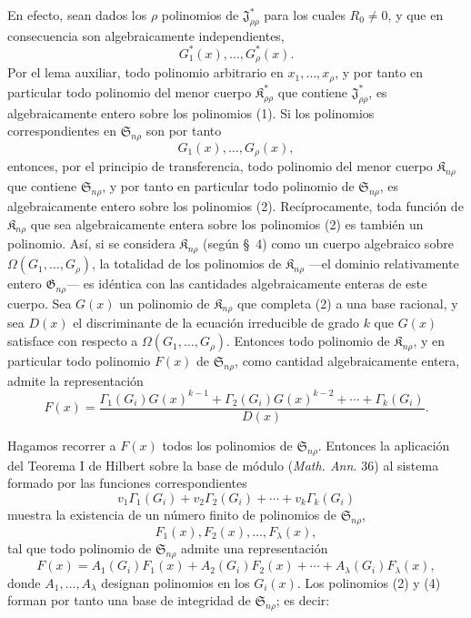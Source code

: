 \documentclass[11pt]{article}
\providecommand{\Kfield}{\mathfrak{K}}
\providecommand{\Ssys}{\mathfrak{S}}
\providecommand{\Jdom}{\mathfrak{J}}
\providecommand{\Gdom}{\mathfrak{G}}
\begin{document}
En efecto, sean dados los $\rho$ polinomios de $\Jdom^*_{\rho\rho}$ para los cuales $R_0\ne0$, y que en consecuencia son algebraicamente independientes,
\begin{equation}
  G_1^*(x),\ldots,G_\rho^*(x).
\tag{1}
\end{equation}
Por el lema auxiliar, todo polinomio arbitrario en $x_1,\ldots,x_\rho$, y por tanto en particular todo polinomio del menor cuerpo $\Kfield^*_{\rho\rho}$ que contiene $\Jdom^*_{\rho\rho}$, es algebraicamente entero sobre los polinomios (1). Si los polinomios correspondientes en $\Ssys_{n\rho}$ son por tanto
\begin{equation}
  G_1(x),\ldots,G_\rho(x),
\tag{2}
\end{equation}
entonces, por el principio de transferencia, todo polinomio del menor cuerpo $\Kfield_{n\rho}$ que contiene $\Ssys_{n\rho}$, y por tanto en particular todo polinomio de $\Ssys_{n\rho}$, es algebraicamente entero sobre los polinomios (2). Recíprocamente, toda función de $\Kfield_{n\rho}$ que sea algebraicamente entera sobre los polinomios (2) es también un polinomio. Así, si se considera $\Kfield_{n\rho}$ (según \S\ 4) como un cuerpo algebraico sobre $\Omega(G_1,\ldots,G_\rho)$, la totalidad de los polinomios de $\Kfield_{n\rho}$ ---el dominio relativamente entero $\Gdom_{n\rho}$--- es idéntica con las cantidades algebraicamente enteras de este cuerpo. Sea $G(x)$ un polinomio de $\Kfield_{n\rho}$ que completa (2) a una base racional, y sea $D(x)$ el discriminante de la ecuación irreducible de grado $k$ que $G(x)$ satisface con respecto a $\Omega(G_1,\ldots,G_\rho)$. Entonces todo polinomio de $\Kfield_{n\rho}$, y en particular todo polinomio $F(x)$ de $\Ssys_{n\rho}$, como cantidad algebraicamente entera, admite la representación
\begin{equation}
  F(x)=\frac{\Gamma_1(G_i)G(x)^{k-1}+\Gamma_2(G_i)G(x)^{k-2}+\cdots+\Gamma_k(G_i)}{D(x)}.
\tag{3}
\end{equation}

Hagamos recorrer a $F(x)$ todos los polinomios de $\Ssys_{n\rho}$. Entonces la aplicación del Teorema I de Hilbert sobre la base de módulo (\emph{Math. Ann.} 36) al sistema formado por las funciones correspondientes
\[
  v_1\Gamma_1(G_i)+v_2\Gamma_2(G_i)+\cdots+v_k\Gamma_k(G_i)
\]
muestra la existencia de un número finito de polinomios de $\Ssys_{n\rho}$,
\begin{equation}
  F_1(x),F_2(x),\ldots,F_\lambda(x),
\tag{4}
\end{equation}
tal que todo polinomio de $\Ssys_{n\rho}$ admite una representación
\begin{equation}
  F(x)=A_1(G_i)F_1(x)+A_2(G_i)F_2(x)+\cdots+A_\lambda(G_i)F_\lambda(x),
\tag{5}
\end{equation}
donde $A_1,\ldots,A_\lambda$ designan polinomios en los $G_i(x)$. Los polinomios (2) y (4) forman por tanto una base de integridad de $\Ssys_{n\rho}$; es decir:
\end{document}
